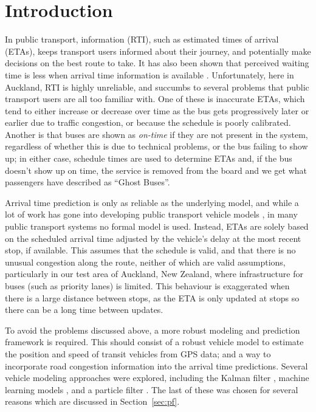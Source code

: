 \section{Introduction}
\label{sec:intro}



In public transport, \rt information (RTI), such as estimated times of arrival (ETAs),
keeps transport users informed about their journey,
and potentially make decisions on the best route to take.
It has also been shown that perceived waiting time is less
when arrival time information is available \citep{TCRP_2003b}.
Unfortunately, here in Auckland, RTI is highly unreliable,
and succumbs to several problems that public transport users
are all too familiar with.
One of these is inaccurate ETAs,
which tend to either increase or decrease over time as the bus gets progressively later or earlier
due to traffic congestion, or  because the schedule is poorly calibrated.
Another is that buses are shown as \emph{on-time} if they are not present
in the \rt system,
regardless of whether this is due to technical problems,
or the bus failing to show up;
in either case, schedule times are used to determine ETAs and, 
if the bus doesn't show up on time,
the service is removed from the \rt board 
and we get what passengers have described as ``Ghost Buses''.

Arrival time prediction is only as reliable as the underlying model,
and while a lot of work has gone into developing public transport vehicle models
\citep{Cathey_2003,Jeong_2005,Yu_2011,Hans_2015},
in many public transport systems no formal model is used.
Instead, ETAs are solely based on the scheduled arrival time
adjusted by the vehicle's delay at the most recent stop, if available.
This assumes that the schedule is valid,
and that there is no unusual congestion along the route,
neither of which are valid assumptions,
particularly in our test area of Auckland, New Zealand,
where infrastructure for buses (such as priority lanes) is limited.
This behaviour is exaggerated when there is a large distance between stops,
as the ETA is only updated at stops so there can be a long time between updates.


To avoid the problems discussed above,
a more robust modeling and prediction framework is required.
This should consist of a robust vehicle model to estimate the position and speed
of transit vehicles from \rt GPS data;
and a way to incorporate road congestion information 
into the arrival time predictions.
Several vehicle modeling approaches were explored, 
including the Kalman filter \citep{Dailey_2001,Cathey_2003},
machine learning models \citep{Yu_2006,Chang_2010},
and a particle filter \citep{Hans_2015}.
The last of these was chosen for several reasons
which are discussed in Section~\ref{sec:pf}.

